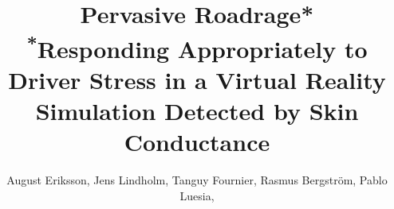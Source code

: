 \documentclass[journal, a4paper]{IEEEtran}
\begin{document}
\title{Pervasive Roadrage*\\ {\footnotesize \textsuperscript{*}Responding
Appropriately to Driver Stress in a Virtual
Reality Simulation Detected by Skin Conductance} %
}

\author{August Eriksson,
  Jens Lindholm,
  Tanguy Fournier,
  Rasmus Bergström,
  Pablo Luesia,
}

\maketitle













\end{document}
